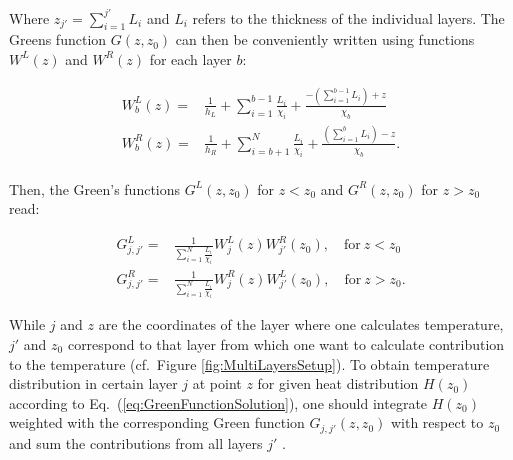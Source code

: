 \documentclass[%
9pt,
 aip,
rsi,%
 amsmath,amssymb,
preprint,%
]{revtex4-1}
\begin{document}
Where $z_{j'}=\sum_{i=1}^{j'} L_i$ and $L_{i}$ refers to the thickness of the individual layers.
The Greens function $G(z,z_0)$ can then be conveniently written using functions $W^L(z)$ and $W^R(z)$ for each layer $b$:%


\begin{subequations}
	 \begin{align}
		W_b^L(z) =& \frac{1}{h_L}+\sum_{i=1}^{b-1} \frac{L_i}{\chi_i} + \frac{-\left( \sum_{i=1}^{b-1} L_i \right) + z}{\chi_b} \label{eq:WL}\\
        W_b^R(z) =& \frac{1}{h_R}+\sum_{i=b+1}^{N} \frac{L_i}{\chi_i} + \frac{\left( \sum_{i=1}^{b} L_i \right)  - z}{\chi_b}. \label{eq:WR}\\
	\end{align}
    \label{eq:Wfunction}
\end{subequations}

Then, the Green's functions $G^{L}(z,z_0)$ for $z<z_0$ and $G^{R}(z,z_0)$ for $z>z_0$ read:

\begin{subequations}
	 \begin{align}
        G_{j,j'}^L =& \frac{1}{\sum_{i=1}^{N} \frac{L_i}{\chi_i}} W^L_{j}(z) W^R_{j'}(z_0), \quad \mathrm{for~} z<z_0 \label{eq:GL}\\
        G_{j,j'}^R =& \frac{1}{\sum_{i=1}^{N} \frac{L_i}{\chi_i}} W^R_{j}(z) W^L_{j'}(z_0), \quad \mathrm{for~} z>z_0. \label{eq:GR}
	\end{align}
    \label{eq:greenfunction}
\end{subequations}

While $j$ and $z$ are the coordinates of the layer where one calculates temperature, $j'$ and $z_0$ correspond to that layer from which one want to calculate contribution to the temperature (cf.~Figure \ref{fig:MultiLayersSetup}). 
To obtain temperature distribution in certain layer $j$ at point $z$ for given heat distribution $H(z_0)$ according to Eq.~(\ref{eq:GreenFunctionSolution}), one should integrate $H(z_0)$ weighted with the corresponding Green function $G_{j,j'}(z,z_0)$ with respect to $z_0$ and sum the contributions from all layers $j'$ . 
\end{document}
